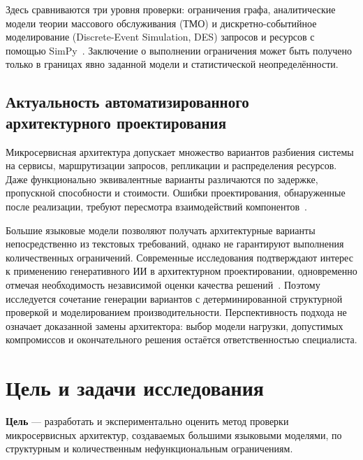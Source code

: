 Здесь сравниваются три уровня проверки: ограничения графа, аналитические модели теории массового обслуживания (ТМО) и дискретно-событийное моделирование (Discrete-Event Simulation, DES) запросов и ресурсов с помощью SimPy~\cite{simpy_docs}. Заключение о выполнении ограничения может быть получено только в границах явно заданной модели и статистической неопределённости.

\subsection{Актуальность автоматизированного архитектурного проектирования}

Микросервисная архитектура допускает множество вариантов разбиения системы на сервисы, маршрутизации запросов, репликации и распределения ресурсов. Даже функционально эквивалентные варианты различаются по задержке, пропускной способности и стоимости. Ошибки проектирования, обнаруженные после реализации, требуют пересмотра взаимодействий компонентов~\cite{bass2015software,becker2009palladio}.

Большие языковые модели позволяют получать архитектурные варианты непосредственно из текстовых требований, однако не гарантируют выполнения количественных ограничений. Современные исследования подтверждают интерес к применению генеративного ИИ в архитектурном проектировании, одновременно отмечая необходимость независимой оценки качества решений~\cite{esposito2026genai,schmid2025architecture}. Поэтому исследуется сочетание генерации вариантов с детерминированной структурной проверкой и моделированием производительности. Перспективность подхода не означает доказанной замены архитектора: выбор модели нагрузки, допустимых компромиссов и окончательного решения остаётся ответственностью специалиста.

\section{Цель и задачи исследования}

\textbf{Цель} --- разработать и экспериментально оценить метод проверки микросервисных архитектур, создаваемых большими языковыми моделями, по структурным и количественным нефункциональным ограничениям.

